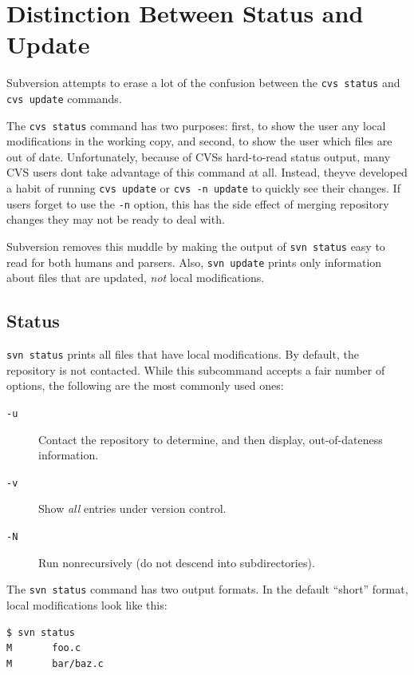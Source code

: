 \section{Distinction Between Status and
Update}\label{svn.forcvs.status-vs-update}

Subversion attempts to erase a lot of the confusion between the
\texttt{cvs\ status} and \texttt{cvs\ update} commands.

The \texttt{cvs\ status} command has two purposes: first, to show the
user any local modifications in the working copy, and second, to show
the user which files are out of date. Unfortunately, because of
CVS\textquotesingle s hard-to-read status output, many CVS users
don\textquotesingle t take advantage of this command at all. Instead,
they\textquotesingle ve developed a habit of running
\texttt{cvs\ update} or \texttt{cvs\ -n\ update} to quickly see their
changes. If users forget to use the \texttt{-n} option, this has the
side effect of merging repository changes they may not be ready to deal
with.

Subversion removes this muddle by making the output of
\texttt{svn\ status} easy to read for both humans and parsers. Also,
\texttt{svn\ update} prints only information about files that are
updated, \emph{not} local modifications.

\subsection{Status}\label{svn.forcvs.status-vs-update.status}

\texttt{svn\ status} prints all files that have local modifications. By
default, the repository is not contacted. While this subcommand accepts
a fair number of options, the following are the most commonly used ones:

\begin{description}
\item[\texttt{-u}]
Contact the repository to determine, and then display, out-of-dateness
information.
\item[\texttt{-v}]
Show \emph{all} entries under version control.
\item[\texttt{-N}]
Run nonrecursively (do not descend into subdirectories).
\end{description}

The \texttt{svn\ status} command has two output formats. In the default
``short'' format, local modifications look like this:

\begin{verbatim}
$ svn status
M       foo.c
M       bar/baz.c
\end{verbatim}

